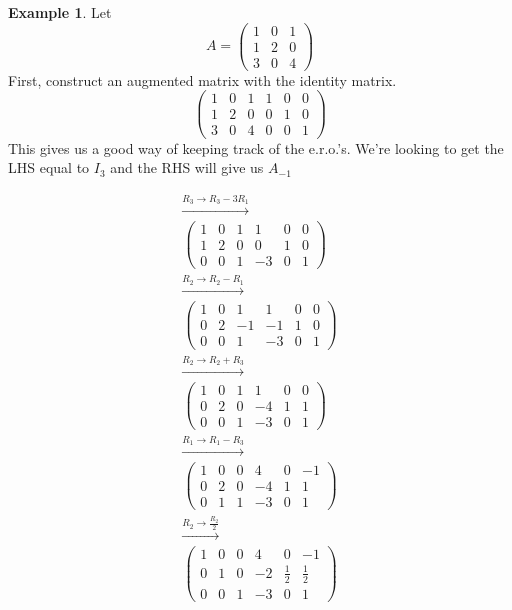 \documentclass{report}
\theoremstyle{remark}
\theoremstyle{definition}
\theoremstyle{definition}
\newtheorem{example}[theorem]{Example}
\theoremstyle{theorem}
\begin{document}
\begin{example}
Let
\[A = \begin{pmatrix}
1&0&1\\
1&2&0\\
3&0&4
\end{pmatrix} \]
First, construct an augmented matrix with the identity matrix.
\[ 
\left(\begin{array}{ccc|ccc}
1&0&1&1&0&0\\
1&2&0&0&1&0\\
3&0&4&0&0&1
\end{array}\right)
\]
This gives us a good way of keeping track of the e.r.o.'s. We're looking to get the LHS equal to $I_3$ and the RHS will give us $A_{-1}$ \par
\begin{center}
    \begin{align*}
    \xrightarrow{R_3 \rightarrow R_3 - 3R_1}\\
    \left(\begin{array}{ccc|ccc}
    1&0&1&1&0&0\\
    1&2&0&0&1&0\\
    0&0&1&-3&0&1
    \end{array}\right)\\
    \xrightarrow{R_2 \rightarrow R_2-R_1}\\
    \left(\begin{array}{ccc|ccc}
    1&0&1&1&0&0\\
    0&2&-1&-1&1&0\\
    0&0&1&-3&0&1
    \end{array}\right)\\
    \xrightarrow{R_2 \rightarrow R_2 + R_3}\\
    \left(\begin{array}{ccc|ccc}
    1&0&1&1&0&0\\
    0&2&0&-4&1&1\\
    0&0&1&-3&0&1
    \end{array}\right)\\
    \xrightarrow{R_1 \rightarrow R_1-R_3}\\
    \left(\begin{array}{ccc|ccc}
    1&0&0&4&0&-1\\
    0&2&0&-4&1&1\\
    0&1&1&-3&0&1
    \end{array}\right)\\
    \xrightarrow{R_2 \rightarrow \frac{R_2}{2}}\\
    \left(\begin{array}{ccc|ccc}
    1&0&0&4&0&-1\\
    0&1&0&-2&\frac{1}{2}&\frac{1}{2}\\
    0&0&1&-3&0&1
    \end{array}\right)
    \end{align*}
\end{center}
\end{example}
\end{document}
